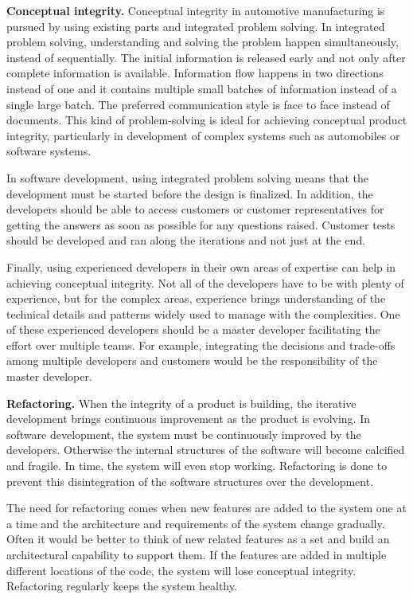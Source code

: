 \textbf{Conceptual integrity.}
Conceptual integrity in automotive manufacturing is pursued by using existing parts and integrated problem solving. In integrated problem solving, understanding and solving the problem happen simultaneously, instead of sequentially. The initial information is released early and not only after complete information is available. Information flow happens in two directions instead of one and it contains multiple small batches of information instead of a single large batch. The preferred communication style is face to face instead of documents. This kind of problem-solving is ideal for achieving conceptual product integrity, particularly in development of complex systems such as automobiles or software systems.

In software development, using integrated problem solving means that the development must be started before the design is finalized. In addition, the developers should be able to access customers or customer representatives for getting the answers as soon as possible for any questions raised. Customer tests should be developed and ran along the iterations and not just at the end.

Finally, using experienced developers in their own areas of expertise can help in achieving conceptual integrity. Not all of the developers have to be with plenty of experience, but for the complex areas, experience brings understanding of the technical details and patterns widely used to manage with the complexities. One of these experienced developers should be a master developer facilitating the effort over multiple teams. For example, integrating the decisions and trade-offs among multiple developers and customers would be the responsibility of the master developer.

\textbf{Refactoring.} When the integrity of a product is building, the iterative development brings continuous improvement as the product is evolving. In software development, the system must be continuously improved by the developers. Otherwise the internal structures of the software will become calcified and fragile. In time, the system will even stop working. Refactoring is done to prevent this disintegration of the software structures over the development.

The need for refactoring comes when new features are added to the system one at a time and the architecture and requirements of the system change gradually. Often it would be better to think of new related features as a set and build an architectural capability to support them. If the features are added in multiple different locations of the code, the system will lose conceptual integrity. Refactoring regularly keeps the system healthy.

